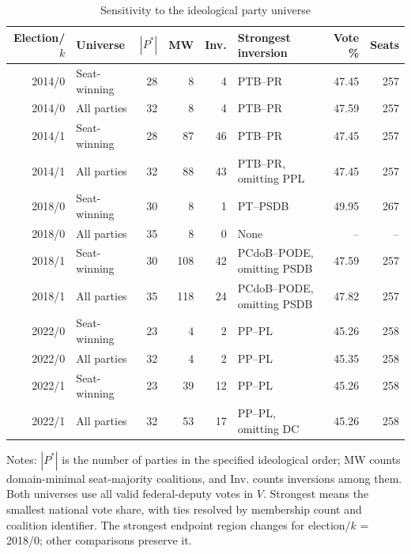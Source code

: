 \begin{table}[!htbp]
\centering\small
\caption{Sensitivity to the ideological party universe}
\label{tab:ideological-universe-comparison}
\setlength{\tabcolsep}{3pt}
\begin{tabularx}{\textwidth}{@{}rlrrr>{\raggedright\arraybackslash}Xrr@{}}
\toprule
Election/$k$ & Universe & $|P^*|$ & MW & Inv. & Strongest inversion & Vote \% & Seats \\
\midrule
2014/0 & Seat-winning & 28 & 8 & 4 & PTB--PR & 47.45 & 257 \\
2014/0 & All parties & 32 & 8 & 4 & PTB--PR & 47.59 & 257 \\
2014/1 & Seat-winning & 28 & 87 & 46 & PTB--PR & 47.45 & 257 \\
2014/1 & All parties & 32 & 88 & 43 & PTB--PR, omitting PPL & 47.45 & 257 \\
2018/0 & Seat-winning & 30 & 8 & 1 & PT--PSDB & 49.95 & 267 \\
2018/0 & All parties & 35 & 8 & 0 & None & -- & -- \\
2018/1 & Seat-winning & 30 & 108 & 42 & PCdoB--PODE, omitting PSDB & 47.59 & 257 \\
2018/1 & All parties & 35 & 118 & 24 & PCdoB--PODE, omitting PSDB & 47.82 & 257 \\
2022/0 & Seat-winning & 23 & 4 & 2 & PP--PL & 45.26 & 258 \\
2022/0 & All parties & 32 & 4 & 2 & PP--PL & 45.35 & 258 \\
2022/1 & Seat-winning & 23 & 39 & 12 & PP--PL & 45.26 & 258 \\
2022/1 & All parties & 32 & 53 & 17 & PP--PL, omitting DC & 45.26 & 258 \\
\bottomrule\end{tabularx}
\begin{minipage}{\textwidth}\footnotesize Notes: $|P^*|$ is the number of parties in the specified ideological order; MW counts domain-minimal seat-majority coalitions, and Inv. counts inversions among them. Both universes use all valid federal-deputy votes in $V$. Strongest means the smallest national vote share, with ties resolved by membership count and coalition identifier.
The strongest endpoint region changes for election/$k$ = 2018/0; other comparisons preserve it.
\end{minipage}\end{table}
